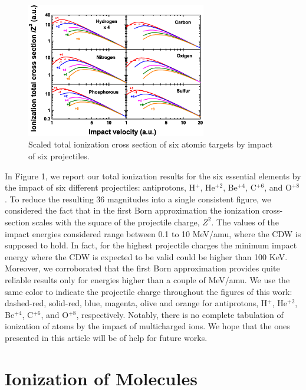 \documentclass[preprint,12pt]{article}
\begin{document}
\begin{figure}[H]
\centering
\includegraphics[width=0.7\textwidth]{figuras/Fig_finales/Fig1.eps}
\caption{Scaled total ionization cross section of six atomic targets 
by impact of six projectiles.}
\label{eq:atomscaling}
\end{figure} 
In Figure 1, we report our total ionization results for the six 
essential elements by the impact of six different projectiles: 
antiprotons, H$^{+}$, He$^{+2}$, Be$^{+4}$, C$^{+6}$, and O$^{+8}$. 
To reduce the resulting 36 magnitudes into a single consistent 
figure, we considered the fact that in the first Born approximation
the ionization cross-section scales with the square of the projectile 
charge, $Z^{2}$. The values of the impact energies considered 
range between 0.1 to 10 MeV/amu, where the CDW is supposed 
to hold. In fact, for the highest projectile charges the minimum 
impact energy where the CDW is expected to be valid could be 
higher than 100 KeV. Moreover, we corroborated that the first Born 
approximation provides quite reliable results only for energies higher 
than a couple of MeV/amu. We use the same color to indicate the 
projectile charge throughout the figures of this work: dashed-red, 
solid-red, blue, magenta, olive and orange for antiprotons, 
H$^{+}$, He$^{+2}$, Be$^{+4}$, C$^{+6}$, and O$^{+8}$, respectively. 
Notably, there is no complete tabulation of ionization of atoms by 
the impact of multicharged ions. We hope that the ones presented 
in this article will be of help for future works.

\section{Ionization of Molecules}
\end{document}
